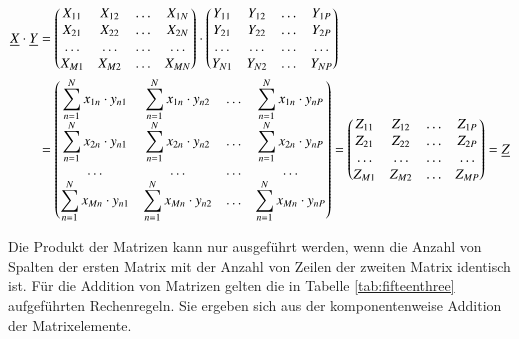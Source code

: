 \begin{equation}\label{eq:fifteenfourteen}
\begin{split}
\underline{X} \cdot \underline{Y} & =
\begin{pmatrix}
X_{11} & X_{12} & \dots & X_{1N}\\
X_{21} & X_{22} & \dots & X_{2N}\\
\dots & \dots & \dots & \dots\\
X_{M1} & X_{M2} & \dots & X_{MN}\\
\end{pmatrix} \cdot
\begin{pmatrix}
Y_{11} & Y_{12} & \dots & Y_{1P}\\
Y_{21} & Y_{22} & \dots & Y_{2P}\\
\dots & \dots & \dots & \dots\\
Y_{N1} & Y_{N2} & \dots & Y_{NP}\\
\end{pmatrix} \\
& =
\begin{pmatrix}
\displaystyle\sum\limits_{n=1}^{N}x_{1n}\cdot y_{n1} & \displaystyle\sum\limits_{n=1}^{N}x_{1n}\cdot y_{n2} & \dots & \displaystyle\sum\limits_{n=1}^{N}x_{1n}\cdot y_{nP}\\
\displaystyle\sum\limits_{n=1}^{N}x_{2n}\cdot y_{n1} &
\displaystyle\sum\limits_{n=1}^{N}x_{2n}\cdot y_{n2} &
\dots & \displaystyle\sum\limits_{n=1}^{N}x_{2n}\cdot y_{nP}\\
\dots & \dots & \dots & \dots\\
\displaystyle\sum\limits_{n=1}^{N}x_{Mn}\cdot y_{n1} &
\displaystyle\sum\limits_{n=1}^{N}x_{Mn}\cdot y_{n2} &
\dots & \displaystyle\sum\limits_{n=1}^{N}x_{Mn}\cdot y_{nP}\\
\end{pmatrix} =
\begin{pmatrix}
Z_{11} & Z_{12} & \dots & Z_{1P}\\
Z_{21} & Z_{22} & \dots & Z_{2P}\\
\dots & \dots & \dots & \dots\\
Z_{M1} & Z_{M2} & \dots & Z_{MP}\\
\end{pmatrix} = \underline{Z}
\end{split}
\end{equation}

\noindent Die Produkt der Matrizen kann nur ausgef\"{u}hrt werden, wenn die Anzahl von Spalten der ersten Matrix mit der Anzahl von Zeilen der zweiten Matrix identisch ist. F\"{u}r die Addition von Matrizen gelten die in Tabelle \ref{tab:fifteenthree} aufgef\"{u}hrten Rechenregeln. Sie ergeben sich aus der komponentenweise Addition der Matrixelemente.

